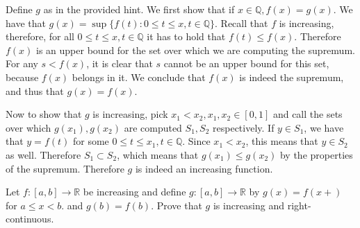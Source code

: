 \begin{solution}

Define $g$ as in the provided hint.
We first show that if $x \in \mathbb{Q}, f(x) = g(x)$.
We have that $g(x) = \sup\{ f(t) : 0 \leq t \leq x, t \in \mathbb{Q}\}$.
Recall that $f$ is increasing, therefore, for all $0 \leq t \leq x, t \in \mathbb{Q}$ it has to hold that $f(t) \leq f(x)$. 
Therefore $f(x)$ is an upper bound for the set over which we are computing the supremum.
For any $s < f(x)$, it is clear that $s$ cannot be an upper bound for this set, because $f(x)$ belongs in it.
We conclude that $f(x)$ is indeed the supremum, and thus that $g(x) = f(x)$.

Now to show that $g$ is increasing, pick $x_1 < x_2, x_1, x_2 \in [0, 1]$ and call the sets over which $g(x_1), g(x_2)$ are computed $S_1, S_2$ respectively.
If $y \in S_1$, we have that $y = f(t)$ for some $0 \leq t \leq x_1, t \in \mathbb{Q}$.
Since $x_1 < x_2$, this means that $y \in S_2$ as well. Therefore $S_1 \subset S_2$, which means that $g(x_1) \leq g(x_2)$ by the properties of the supremum. Therefore $g$ is indeed an increasing function.

    
\end{solution}

\begin{exercise}{51}
    Let $f: [a, b] \rightarrow \mathbb{R}$ be increasing and define $g: [a, b] \rightarrow \mathbb{R}$ by $g(x) = f(x+)$ for $a \leq x < b$. and $g(b) = f(b)$. 
    Prove that $g$ is increasing and right-continuous.
\end{exercise}


